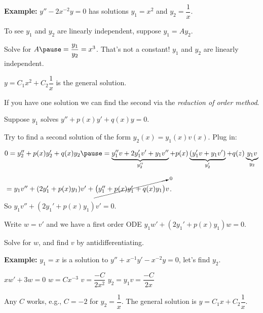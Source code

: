 \documentclass[10pt,aspectratio=169]{beamer}
\begin{document}
\begin{frame}
\textbf{Example:}
$y''-2x^{-2}y = 0$ has solutions $y_1 = x^2$ and $y_2 = \dfrac{1}{x}$.

\medskip
\pause

To see $y_1$ and $y_2$ are linearly independent, suppose
$y_1 = A y_2$.

\medskip
\pause

Solve for $A \pause = \dfrac{y_1}{y_2} = x^3$.
\pause
That's not a constant!
\pause \wthus $y_1$ and $y_2$ are linearly independent.

\medskip
\pause

\thus
\quad
$y = C_1 x^2 + C_2\dfrac{1}{x}$ \quad is the general solution.

\end{frame}

\begin{frame}
If you have one solution we can find the second
via the
\emph{reduction of order method}.

\medskip
\pause

Suppose $y_1$ solves
$y'' + p(x) y' + q(x) y = 0$.

\pause

Try to find a second solution of the form $y_2(x) = y_1(x) v(x)$.
\pause
Plug in:

\medskip

\quad
$
0 = y_2'' + p(x) y_2' + q(x) y_2
\pause
=
\underbrace{y_1'' v + 2 y_1' v' + y_1 v''}_{y_2''}
+ p(x) \underbrace{( y_1' v + y_1 v' )}_{y_2'}
+ q(z) \underbrace{y_1 v}_{y_2}$

\vspace*{-4pt}
\pause
\quad
\phantom{$0 = y_2'' + p(x) y_2' + q(x) y_2$}%
${} =
y_1 v''
+ (2 y_1' + p(x) y_1) v'
+
\cancelto{0}{\bigl( y_1'' + p(x) y_1' + q(x) y_1 \bigr)} v$.


\medskip
\pause

So
$y_1 v'' + (2 y_1' + p(x) y_1) v' = 0$.


\medskip
\pause

Write $w = v'$ and we have a first order ODE
\quad
$y_1 w' + (2 y_1' + p(x) y_1) w = 0$.

\medskip
\pause

Solve for $w$, and find $v$ by antidifferentiating.

\medskip
\pause

\textbf{Example:}
$y_1 = x$ is a solution to $y''+x^{-1}y'-x^{-2} y=0$, let's find $y_2$.

\medskip
\pause

\thus \quad $xw' + 3 w = 0$
\pause
\wthus
$w = Cx^{-3}$
\pause
\wthus
$v = \dfrac{-C}{2x^2}$
\pause
\wthus
$y_2 = y_1 v = \dfrac{-C}{2x}$

\medskip
\pause

Any $C$ works, e.g., $C=-2$ for $y_2 = \dfrac{1}{x}$.
\pause
\wthus
The general solution is \quad $y = C_1 x + C_2\dfrac{1}{x}$.

\end{frame}
\end{document}
